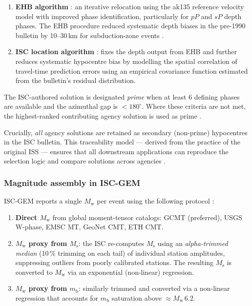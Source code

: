 \documentclass[12pt]{article}
\newcommand{\catalogs}{catalogs}
\begin{document}
\begin{enumerate}
  \item \textbf{EHB algorithm} \citep{Engdahl1998}: an iterative relocation
        using the ak135 reference velocity model \citep{Kennett1995} with
        improved phase identification, particularly for $pP$ and $sP$ depth
        phases.  The EHB procedure reduced systematic depth biases in the
        pre-1990 bulletin by 10--30\,km for subduction-zone events
        \citep{Engdahl1998}.

  \item \textbf{ISC location algorithm} \citep{Bondar2011}: fixes the depth
        output from EHB and further reduces systematic hypocentre bias by
        modelling the spatial correlation of travel-time prediction errors
        using an empirical covariance function estimated from the bulletin's
        residual distribution.
\end{enumerate}

The ISC-authored solution is designated \emph{prime} when at least 6 defining
phases are available and the azimuthal gap is $< 180^\circ$.  Where these
criteria are not met, the highest-ranked contributing agency solution is used
as prime \citep{ISCGEM2018}.

Crucially, \emph{all} agency solutions are retained as secondary (non-prime)
hypocentres in the ISC bulletin.  This traceability model — derived from the
practice of the original ISS — ensures that all downstream applications can
reproduce the selection logic and compare solutions across agencies
\citep{ISCBulletinRebuild2020}.

\subsubsection{Magnitude assembly in ISC-GEM}

ISC-GEM reports a single $M_\mathrm{w}$ per event using the following protocol
\citep{ISCGEM2018}:

\begin{enumerate}
  \item \textbf{Direct $M_\mathrm{w}$} from global moment-tensor \catalogs:
        GCMT \citep{Dziewonski1981, Ekstrom2012} (preferred),
        USGS W-phase, EMSC MT, GeoNet CMT, ETH CMT.

  \item \textbf{$M_\mathrm{w}$ proxy from $M_\mathrm{s}$}: the ISC re-computes
        $M_\mathrm{s}$ using an \emph{alpha-trimmed median} (10\,\% trimming on
        each tail) of individual station amplitudes, suppressing outliers from
        poorly calibrated stations.  The resulting $M_\mathrm{s}$ is converted
        to $M_\mathrm{w}$ via an exponential (non-linear) regression.

  \item \textbf{$M_\mathrm{w}$ proxy from $m_\mathrm{b}$}: similarly trimmed
        and converted via a non-linear regression that accounts for
        $m_\mathrm{b}$ saturation above $\approx M_\mathrm{w}$\,6.2.
\end{enumerate}
\end{document}
